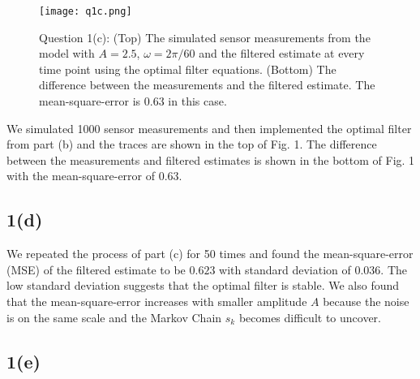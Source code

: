\documentclass[a4paper, 11pt]{article}
\begin{document}
\begin{figure}
	\begin{center}
		\texttt{[image: q1c.png]}
		\caption{Question 1(c): (Top) The simulated sensor measurements from the model with $A = 2.5$, $\omega = 2\pi/60$ and the filtered estimate at every time point using the optimal filter equations. (Bottom) The difference between the measurements and the filtered estimate. The mean-square-error is $0.63$ in this case. }
	\end{center}
	\label{fig:q1c}
\end{figure}

We simulated 1000 sensor measurements and then implemented the optimal filter from part (b) and the traces are shown in the top of Fig. 1. The difference between the measurements and filtered estimates is shown in the bottom of Fig. 1 with the mean-square-error of $0.63$.  



\subsection*{1(d)}

We repeated the process of part (c) for 50 times and found the mean-square-error (MSE) of the filtered estimate to be $0.623$ with standard deviation of $0.036$. The low standard deviation suggests that the optimal filter is stable. We also found that the mean-square-error increases with smaller amplitude $A$ because the noise is on the same scale and the Markov Chain $s_k$ becomes difficult to uncover.  



\subsection*{1(e)}
\end{document}
